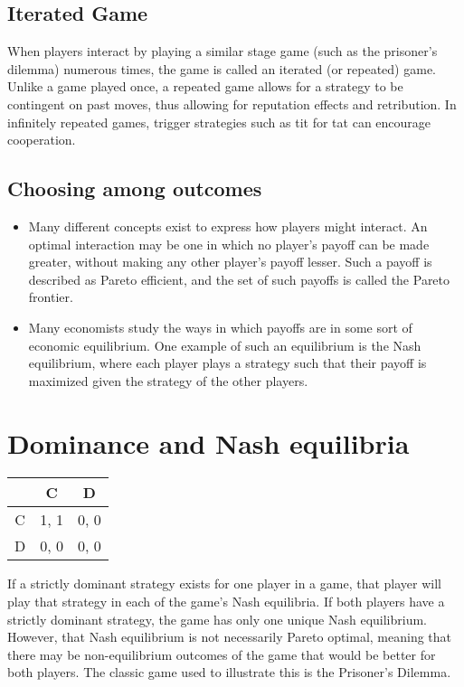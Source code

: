 \documentclass[]{report}
\begin{document}
\subsection{Iterated Game}
When players interact by playing a similar stage game (such as the prisoner's dilemma) numerous times, the game is called an iterated (or repeated) game. Unlike a game played once, a repeated game allows for a strategy to be contingent on past moves, thus allowing for reputation effects and retribution. In infinitely repeated games, trigger strategies such as tit for tat can encourage cooperation.

\subsection{Choosing among outcomes}
\begin{itemize}
\item Many different concepts exist to express how players might interact. An optimal interaction may be one in which no player's payoff can be made greater, without making any other player's payoff lesser. Such a payoff is described as Pareto efficient, and the set of such payoffs is called the Pareto frontier.
\item 
Many economists study the ways in which payoffs are in some sort of economic equilibrium. One example of such an equilibrium is the Nash equilibrium, where each player plays a strategy such that their payoff is maximized given the strategy of the other players.
\end{itemize}





\section{Dominance and Nash equilibria}
\begin{tabular}{|c|c|c|} \hline
      &  C   &	D  \\ \hline
C     &	1, 1 & 	0, 0 \\ \hline
D     &	0, 0 &	0, 0 \\ \hline
\end{tabular}
If a strictly dominant strategy exists for one player in a game, that player will play that strategy in each of the game's Nash equilibria. If both players have a strictly dominant strategy, the game has only one unique Nash equilibrium. However, that Nash equilibrium is not necessarily Pareto optimal, meaning that there may be non-equilibrium outcomes of the game that would be better for both players. The classic game used to illustrate this is the Prisoner's Dilemma.
\end{document}
